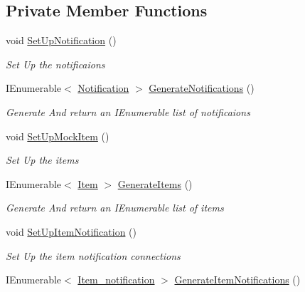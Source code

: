 \subsection*{Private Member Functions}
\begin{DoxyCompactItemize}
\item 
void \mbox{\hyperlink{class_gtd_app_1_1_logic_1_1_tests_1_1_business_logic_tests_ab01d494661fcd610470e6cb2df9007ec}{Set\+Up\+Notification}} ()
\begin{DoxyCompactList}\small\item\em Set Up the notificaions \end{DoxyCompactList}\item 
I\+Enumerable$<$ \mbox{\hyperlink{class_gtd_app_1_1_data_1_1_notification}{Notification}} $>$ \mbox{\hyperlink{class_gtd_app_1_1_logic_1_1_tests_1_1_business_logic_tests_aa0d7989e760f0bbfddda800d4f7ac725}{Generate\+Notifications}} ()
\begin{DoxyCompactList}\small\item\em Generate And return an I\+Enumerable list of notificaions \end{DoxyCompactList}\item 
void \mbox{\hyperlink{class_gtd_app_1_1_logic_1_1_tests_1_1_business_logic_tests_aaad26480a00eee8aa2b41c8346fee2b0}{Set\+Up\+Mock\+Item}} ()
\begin{DoxyCompactList}\small\item\em Set Up the items \end{DoxyCompactList}\item 
I\+Enumerable$<$ \mbox{\hyperlink{class_gtd_app_1_1_data_1_1_item}{Item}} $>$ \mbox{\hyperlink{class_gtd_app_1_1_logic_1_1_tests_1_1_business_logic_tests_a05753cb7df89cdae2dd2a126db5e4c4d}{Generate\+Items}} ()
\begin{DoxyCompactList}\small\item\em Generate And return an I\+Enumerable list of items \end{DoxyCompactList}\item 
void \mbox{\hyperlink{class_gtd_app_1_1_logic_1_1_tests_1_1_business_logic_tests_a76e0af2dcee2e75c4c83de6854c8d722}{Set\+Up\+Item\+Notification}} ()
\begin{DoxyCompactList}\small\item\em Set Up the item notification connections \end{DoxyCompactList}\item 
I\+Enumerable$<$ \mbox{\hyperlink{class_gtd_app_1_1_data_1_1_item__notification}{Item\+\_\+notification}} $>$ \mbox{\hyperlink{class_gtd_app_1_1_logic_1_1_tests_1_1_business_logic_tests_a0225159a8407e0b5ec052ba03a4d2c21}{Generate\+Item\+Notifications}} ()

\end{DoxyCompactItemize}
